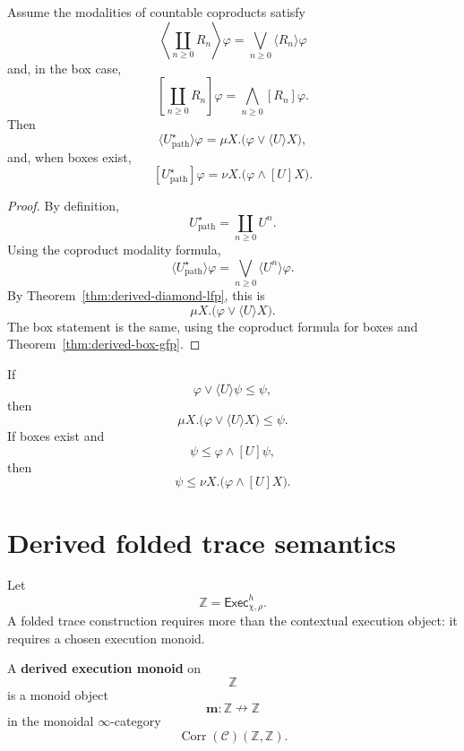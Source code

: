 \begin{theorem}
\label{thm:derived-path-fixed-point-comparison}
Assume the modalities of countable coproducts satisfy
\[
\left\langle\coprod_{n\ge0}R_n\right\rangle\varphi
=
\bigvee_{n\ge0}\langle R_n\rangle\varphi
\]
and, in the box case,
\[
\left[\coprod_{n\ge0}R_n\right]\varphi
=
\bigwedge_{n\ge0}[R_n]\varphi.
\]
Then
\[
\langle U^\star_{\mathrm{path}}\rangle\varphi
=
\mu X.\bigl(\varphi\vee\langle U\rangle X\bigr),
\]
and, when boxes exist,
\[
[U^\star_{\mathrm{path}}]\varphi
=
\nu X.\bigl(\varphi\wedge[U]X\bigr).
\]
\end{theorem}

\begin{proof}
By definition,
\[
U^\star_{\mathrm{path}}
=
\coprod_{n\ge0}U^n.
\]
Using the coproduct modality formula,
\[
\langle U^\star_{\mathrm{path}}\rangle\varphi
=
\bigvee_{n\ge0}\langle U^n\rangle\varphi.
\]
By Theorem~\ref{thm:derived-diamond-lfp}, this is
\[
\mu X.\bigl(\varphi\vee\langle U\rangle X\bigr).
\]
The box statement is the same, using the coproduct formula for boxes and
Theorem~\ref{thm:derived-box-gfp}.
\end{proof}

\begin{corollary}
\label{cor:derived-induction-coinduction}
If
\[
\varphi\vee\langle U\rangle\psi\le\psi,
\]
then
\[
\mu X.\bigl(\varphi\vee\langle U\rangle X\bigr)\le\psi.
\]
If boxes exist and
\[
\psi\le\varphi\wedge[U]\psi,
\]
then
\[
\psi\le\nu X.\bigl(\varphi\wedge[U]X\bigr).
\]
\end{corollary}

\section{Derived folded trace semantics}
\label{sec:derived-folded-trace-semantics}

Let
\[
\mathbb Z=\mathsf{Exec}^h_{\chi,\rho}.
\]
A folded trace construction requires more than the contextual execution object:
it requires a chosen execution monoid.

\begin{definition}
\label{def:derived-execution-monoid}
A \textbf{derived execution monoid} on
\[
\mathbb Z
\]
is a monoid object
\[
\mathbf m:\mathbb Z\nrightarrow\mathbb Z
\]
in the monoidal \(\infty\)-category
\[
\operatorname{Corr}(\mathcal C)(\mathbb Z,\mathbb Z).
\]
\end{definition}

